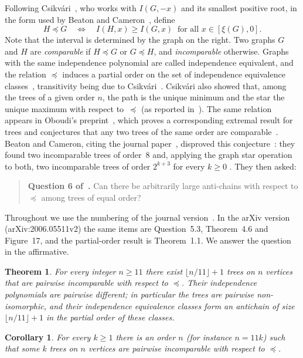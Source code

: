 \documentclass[11pt]{article}
\newtheorem{theorem}{Theorem}
\newtheorem{corollary}{Corollary}
\theoremstyle{definition}
\theoremstyle{remark}
\begin{document}
Following Csikvári~\cite[Section~8]{cs}, who works with $I(G,-x)$ and its
smallest positive root, in the form used by Beaton and
Cameron~\cite[p.~31]{bc}, define
\[
H\preceq G \quad\Longleftrightarrow\quad I(H,x)\ge I(G,x)\ \text{ for all }
x\in[\xi(G),0].
\]
Note that the interval is determined by the graph on the right. Two graphs $G$
and $H$ are \emph{comparable} if $H\preceq G$ or $G\preceq H$, and
\emph{incomparable} otherwise. Graphs with the same independence polynomial
are called independence equivalent, and the relation $\preceq$ induces a
partial order on the set of independence equivalence classes~\cite[Theorem~1]{bc},
transitivity being due to Csikvári~\cite[Section~8]{cs}. Csikvári also showed that, among the trees of
a given order $n$, the path is the unique minimum and the star the unique
maximum with respect to~$\preceq$ (as reported in~\cite[Section~4]{bc}). The
same relation appears in Oboudi's preprint~\cite{ob}, which proves a corresponding
extremal result for trees and conjectures that any two trees of the same order
are comparable~\cite[Conjecture~1]{ob}. Beaton and Cameron, citing the journal paper~\cite{ob18}, disproved this
conjecture~\cite[Section~3.1]{bc}: they found two incomparable trees of order~$8$ and, applying the
graph star operation to both, two incomparable trees of order $2^{k+3}$ for
every $k\ge0$ \cite[Figure~16 and Theorem~16]{bc}. They then asked:

\begin{quote}
\textbf{Question 6 of~\cite{bc}.} Can there be arbitrarily large anti-chains
with respect to $\preceq$ among trees of equal order?
\end{quote}

\noindent Throughout we use the numbering of the journal version~\cite{bc}.
In the arXiv version (arXiv:2006.05511v2) the same items are Question~5.3,
Theorem~4.6 and Figure~17, and the partial-order result is Theorem~1.1.
We answer the question in the affirmative.

\begin{theorem}\label{thm:main}
For every integer $n\ge 11$ there exist $\lfloor n/11\rfloor+1$ trees on $n$
vertices that are pairwise incomparable with respect to $\preceq$. Their
independence polynomials are pairwise different; in particular the trees are
pairwise non-isomorphic, and their independence equivalence classes form an
antichain of size $\lfloor n/11\rfloor+1$ in the partial order of these
classes.
\end{theorem}

\begin{corollary}\label{cor:arb}
For every $k\ge1$ there is an order $n$ (for instance $n=11k$) such that some
$k$ trees on $n$ vertices are pairwise incomparable with respect to $\preceq$.
\end{corollary}
\end{document}
